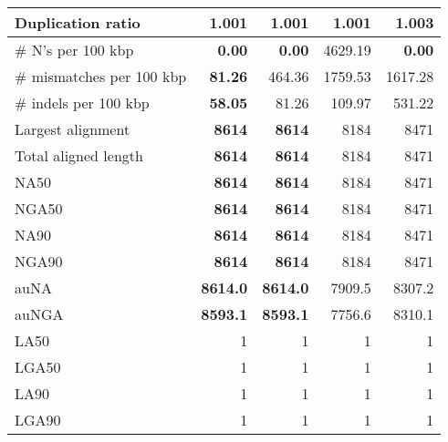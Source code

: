 \documentclass[12pt,a4paper]{article}
\begin{document}
\begin{table}[ht]
\begin{center}
\begin{tabular}{|l*{4}{|r}|}
Duplication ratio & {\bf 1.001} & {\bf 1.001} & {\bf 1.001} & 1.003 \\ \hline
\# N's per 100 kbp & {\bf 0.00} & {\bf 0.00} & 4629.19 & {\bf 0.00} \\ \hline
\# mismatches per 100 kbp & {\bf 81.26} & 464.36 & 1759.53 & 1617.28 \\ \hline
\# indels per 100 kbp & {\bf 58.05} & 81.26 & 109.97 & 531.22 \\ \hline
Largest alignment & {\bf 8614} & {\bf 8614} & 8184 & 8471 \\ \hline
Total aligned length & {\bf 8614} & {\bf 8614} & 8184 & 8471 \\ \hline
NA50 & {\bf 8614} & {\bf 8614} & 8184 & 8471 \\ \hline
NGA50 & {\bf 8614} & {\bf 8614} & 8184 & 8471 \\ \hline
NA90 & {\bf 8614} & {\bf 8614} & 8184 & 8471 \\ \hline
NGA90 & {\bf 8614} & {\bf 8614} & 8184 & 8471 \\ \hline
auNA & {\bf 8614.0} & {\bf 8614.0} & 7909.5 & 8307.2 \\ \hline
auNGA & {\bf 8593.1} & {\bf 8593.1} & 7756.6 & 8310.1 \\ \hline
LA50 & 1 & 1 & 1 & 1 \\ \hline
LGA50 & 1 & 1 & 1 & 1 \\ \hline
LA90 & 1 & 1 & 1 & 1 \\ \hline
LGA90 & 1 & 1 & 1 & 1 \\ \hline
\end{tabular}
\end{center}
\end{table}
\end{document}
